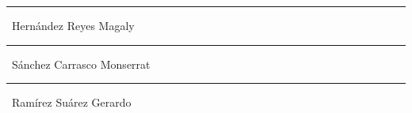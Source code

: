 \noindent\begin{minipage}{0.325\linewidth}
	\begin{center}
		\par\noindent\rule{0.9\textwidth}{0.8pt}
		\noindent\ Hernández Reyes Magaly
	\end{center}
\end{minipage}
\noindent\begin{minipage}{0.325\linewidth}
	\begin{center}
		\par\noindent\rule{0.9\textwidth}{0.8pt}
		\noindent\ Sánchez Carrasco Monserrat
	\end{center}
\end{minipage}	\noindent\begin{minipage}{0.325\linewidth}
	\begin{center}
		\par\noindent\rule{0.9\textwidth}{0.8pt}
		\noindent\ Ramírez Suárez Gerardo
	\end{center}
\end{minipage}
